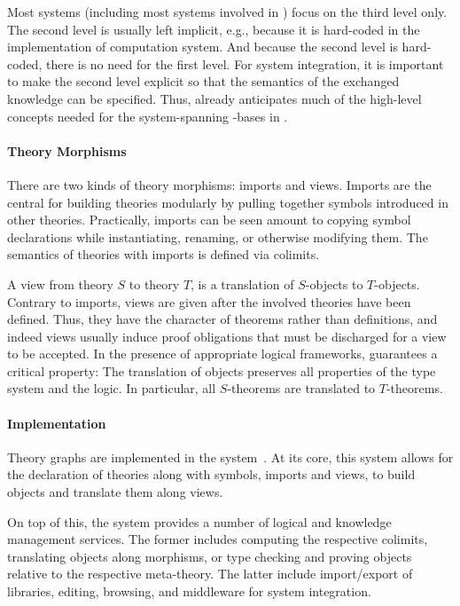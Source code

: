 Most systems (including most systems involved in \pn) focus on the third level only.
The second level is usually left implicit, e.g., because it is hard-coded in the implementation of computation system.
And because the second level is hard-coded, there is no need for the first level.
For system integration, it is important to make the second level explicit so that the semantics of the exchanged knowledge can be specified.
Thus, \MMT already anticipates much of the high-level concepts needed for the system-spanning \DKS-bases in \pn.

\paragraph{Theory Morphisms}
There are two kinds of theory morphisms: imports and views.
Imports are the central for building theories modularly by pulling together symbols introduced in other theories.
Practically, imports can be seen amount to copying symbol declarations while instantiating, renaming, or otherwise modifying them.
The semantics of theories with imports is defined via colimits.

A view from theory $S$ to theory $T$, is a translation of $S$-objects to $T$-objects.
Contrary to imports, views are given after the involved theories have been defined.
Thus, they have the character of theorems rather than definitions, and indeed views usually induce proof obligations that must be discharged for a view to be accepted.
In the presence of appropriate logical frameworks, \MMT guarantees a critical property: The translation of objects preserves all properties of the type system and the logic.
In particular, all $S$-theorems are translated to $T$-theorems.

\paragraph{Implementation}
Theory graphs are implemented in the \MMT system~\cite{Rabe:MAGMS13,uniformal:on}.
At its core, this system allows for the declaration of theories along with symbols, imports and views, to build objects and translate them along views.

On top of this, the \MMT system provides a number of logical and knowledge management services.
The former includes computing the respective colimits, translating objects along morphisms, or type checking and proving objects relative to the respective meta-theory.
The latter include import/export of libraries, editing, browsing, and middleware for system integration.

